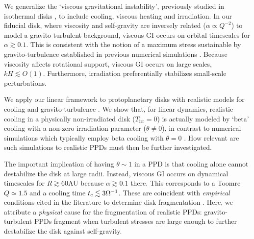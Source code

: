 We generalize the `viscous gravitational instability', previously 
studied in isothermal disks
\citep{lynden-bell74,willerding92,gammie96}, to include 
cooling, viscous heating and irradiation. In our fiducial disk,  
where viscosity and self-gravity are inversely
related ($\alpha\propto Q^{-2}$) to model a
gravito-turbulent background, viscous GI occurs on orbital  
timescales for $\alpha\gtrsim 0.1$. This is consistent with the notion
of a maximum stress sustainable by gravito-turbulence established in
previous numerical simulations \citep{rice05}. Because viscosity affects 
rotational support, viscous GI occurs on large scales, $kH\lesssim
O(1)$.  Furthermore, irradiation preferentially
stabilizes small-scale perturbations. %


We apply our linear framework to protoplanetary disks with 
realistic models for cooling and gravito-turbulence
\citep{rafikov15}. We show that, for linear dynamics, realistic 
cooling in a physically non-irradiated disk ($T_\mathrm{irr}=0$) is
actually modeled by `beta' cooling with a  
non-zero irradiation parameter ($\theta\neq0$), in contrast to 
numerical simulations which typically employ beta cooling with  
$\theta=0$ \citep[e.g.][]{gammie01}. How relevant 
are such simulations to realistic PPDs must then be further 
investigated. 

The important implication of having 
$\theta\sim 1$ in a PPD is that cooling alone cannot 
destabilize the disk at large radii. Instead, viscous GI occurs on
dynamical timescales for $R\gtrsim 60$AU because 
$\alpha\gtrsim0.1$ there. This corresponds to a Toomre $Q\simeq 1.5$ and 
a cooling time $t_\mathrm{c}\lesssim 3\Omega^{-1}$. These are coincident with 
\emph{empirical} conditions cited in the literature to determine disk
fragmentation 
\citep[e.g.][]{rafikov15}. Here, we attribute a \emph{physical}
cause for the fragmentation of realistic PPDs: gravito-turbulent PPDs
fragment when turbulent stresses are large enough to further
destabilize the disk against self-gravity.    


